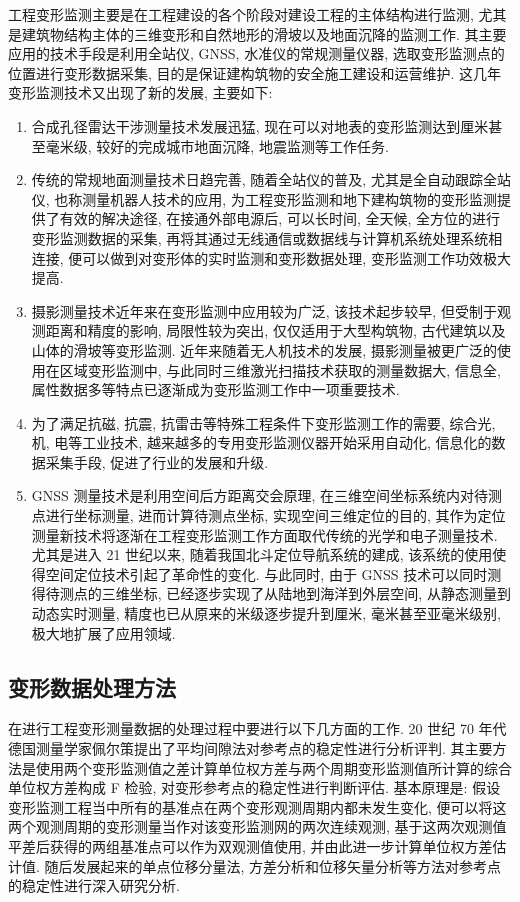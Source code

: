 工程变形监测主要是在工程建设的各个阶段对建设工程的主体结构进行监测, 尤其是建筑物结构主体的三维变形和自然地形的滑坡以及地面沉降的监测工作. 其主要应用的技术手段是利用全站仪, GNSS, 水准仪的常规测量仪器, 选取变形监测点的位置进行变形数据采集, 目的是保证建构筑物的安全施工建设和运营维护. 这几年变形监测技术又出现了新的发展, 主要如下:

\begin{enumerate}
    \item 合成孔径雷达干涉测量技术发展迅猛, 现在可以对地表的变形监测达到厘米甚至毫米级, 较好的完成城市地面沉降, 地震监测等工作任务. 
    \item 传统的常规地面测量技术日趋完善, 随着全站仪的普及, 尤其是全自动跟踪全站仪, 也称测量机器人技术的应用, 为工程变形监测和地下建构筑物的变形监测提供了有效的解决途径, 在接通外部电源后, 可以长时间, 全天候, 全方位的进行变形监测数据的采集, 再将其通过无线通信或数据线与计算机系统处理系统相连接, 便可以做到对变形体的实时监测和变形数据处理, 变形监测工作功效极大提高. 
    \item 摄影测量技术近年来在变形监测中应用较为广泛, 该技术起步较早, 但受制于观测距离和精度的影响, 局限性较为突出, 仅仅适用于大型构筑物, 古代建筑以及山体的滑坡等变形监测. 近年来随着无人机技术的发展, 摄影测量被更广泛的使用在区域变形监测中, 与此同时三维激光扫描技术获取的测量数据大, 信息全, 属性数据多等特点已逐渐成为变形监测工作中一项重要技术. 
    \item 为了满足抗磁, 抗震, 抗雷击等特殊工程条件下变形监测工作的需要, 综合光, 机, 电等工业技术, 越来越多的专用变形监测仪器开始采用自动化, 信息化的数据采集手段, 促进了行业的发展和升级.
    \item GNSS 测量技术是利用空间后方距离交会原理, 在三维空间坐标系统内对待测点进行坐标测量, 进而计算待测点坐标, 实现空间三维定位的目的, 其作为定位测量新技术将逐渐在工程变形监测工作方面取代传统的光学和电子测量技术. 尤其是进入 21 世纪以来, 随着我国北斗定位导航系统的建成, 该系统的使用使得空间定位技术引起了革命性的变化. 与此同时, 由于 GNSS 技术可以同时测得待测点的三维坐标, 已经逐步实现了从陆地到海洋到外层空间, 从静态测量到动态实时测量, 精度也已从原来的米级逐步提升到厘米, 毫米甚至亚毫米级别, 极大地扩展了应用领域.
\end{enumerate}

\subsection{变形数据处理方法}
在进行工程变形测量数据的处理过程中要进行以下几方面的工作. 20 世纪 70 年代德国测量学家佩尔策提出了平均间隙法对参考点的稳定性进行分析评判. 其主要方法是使用两个变形监测值之差计算单位权方差与两个周期变形监测值所计算的综合单位权方差构成 F 检验, 对变形参考点的稳定性进行判断评估. 基本原理是: 假设变形监测工程当中所有的基准点在两个变形观测周期内都未发生变化, 便可以将这两个观测周期的变形测量当作对该变形监测网的两次连续观测, 基于这两次观测值平差后获得的两组基准点可以作为双观测值使用, 并由此进一步计算单位权方差估计值. 随后发展起来的单点位移分量法, 方差分析和位移矢量分析等方法对参考点的稳定性进行深入研究分析. 

